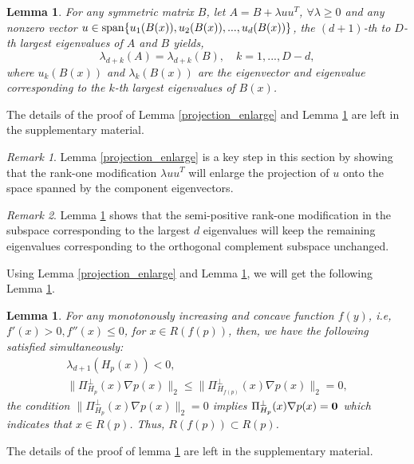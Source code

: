 \documentclass[aos,preprint]{imsart}
\newtheorem{lemma}[theorem]{Lemma}
\theoremstyle{remark}
\newtheorem*{remark}{Remark}
\begin{document}
\begin{lemma}\label{eigvenvalue}
For any symmetric matrix $B$, let $A = B+\lambda u u^T$,  $\forall \lambda \geq 0$ and any nonzero vector $u\in  {\rm span}\{ u_1(B(x)), u_2(B(x)),..., u_d(B(x))\}$, the $(d+1)$-th  to $D$-th largest eigenvalues of $A$ and $B$ yields, 
\[
\lambda_{d+k}(A) = \lambda_{d+k}(B),\quad k=1,...,D-d,
\]
where $u_k(B(x))$ and $\lambda_k(B(x))$ are the eigenvector and eigenvalue corresponding to the $k$-th largest eigenvalues of $B(x)$.
\end{lemma}
The details of the proof of Lemma \ref{projection_enlarge} and Lemma \ref{eigvenvalue} are left in the supplementary material. %
\begin{remark}
Lemma \ref{projection_enlarge} is a key step in this section by showing that the rank-one modification $\lambda uu^T$ will enlarge the projection of $u$ onto the space spanned by the component eigenvectors. 
\end{remark}
\begin{remark}
Lemma \ref{eigvenvalue} shows that the semi-positive rank-one modification in the subspace corresponding to the largest $d$ eigenvalues will keep the remaining eigenvalues corresponding to the orthogonal complement subspace unchanged. 
\end{remark}
Using Lemma \ref{projection_enlarge}  and Lemma \ref{eigvenvalue}, we will get the following Lemma \ref{monotonously theorem}.
\begin{lemma}{
For any monotonously increasing and concave function $f(y)$, i.e,  $f'(x)>0, f''(x) \leq 0$, for $x\in R({f(p)})$, then, we have the following satisfied simultaneously:
 \begin{gather*}
 \lambda_{d+1}(H_p(x)) < 0,\\
\|\Pi_{H_p}^\perp(x)\nabla p(x)\|_2 \leq \|\Pi_{H_{f(p)}}^{\perp}(x)\nabla p(x)\|_2=0,
\end{gather*}
the condition $\|\Pi_{H_p}^\perp(x)\nabla p(x)\|_2  =0$ implies $\Pi_{H_p}^\perp(x)\nabla p(x)=\bf 0$ which indicates that $x\in R(p)$. Thus, $R(f(p)) \subset R(p)$}. %
\label{monotonously theorem} 
\end{lemma}

The details of the proof of lemma \ref{monotonously theorem} are left in the supplementary material. %
\end{document}
